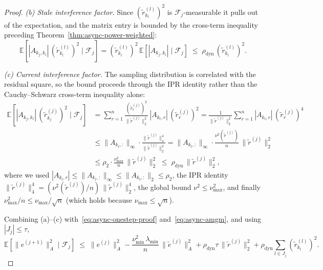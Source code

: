 \documentclass[pdflatex,sn-mathphys-num]{sn-jnl}%
\newcommand{\E}{\mathbb{E}}
\newcommand{\Anorm}[1]{\|#1\|_{A}}
\newcommand{\lmin}{\lambda_{\min}}
\theoremstyle{thmstyleone}%
\theoremstyle{thmstyletwo}%
\theoremstyle{thmstylethree}%
\begin{document}
\begin{proof}
\textit{(b) Stale interference factor.} Since $(\tilde r_{k_l}^{(l)})^2$ is $\mathcal{F}_j$-measurable it pulls out of the expectation, and the matrix entry is bounded by the cross-term inequality preceding Theorem~\ref{thm:async-power-weighted}:
\[
\E\!\left[|A_{k_j, k_l}|\,(\tilde r_{k_l}^{(l)})^2 \mid \mathcal{F}_j\right] = (\tilde r_{k_l}^{(l)})^2\,\E\!\left[|A_{k_j, k_l}| \mid \mathcal{F}_j\right] \;\leq\; \rho_{\text{dyn}}\,(\tilde r_{k_l}^{(l)})^2.
\]

\textit{(c) Current interference factor.} The sampling distribution is correlated with the residual square, so the bound proceeds through the IPR identity rather than the Cauchy--Schwarz cross-term inequality alone:
\begin{align*}
\E\!\left[|A_{k_j, k_l}|\,(\tilde r_{k_j}^{(j)})^2 \mid \mathcal{F}_j\right]
&= \sum_{r=1}^n \frac{(\tilde r_r^{(j)})^2}{\|\tilde r^{(j)}\|_2^2}\,|A_{k_l, r}|\,(\tilde r_r^{(j)})^2
= \frac{1}{\|\tilde r^{(j)}\|_2^2}\sum_{r=1}^n |A_{k_l, r}|\,(\tilde r_r^{(j)})^4 \\
&\leq \|A_{k_l, :}\|_\infty \cdot \frac{\|\tilde r^{(j)}\|_4^4}{\|\tilde r^{(j)}\|_2^2}
= \|A_{k_l, :}\|_\infty \cdot \frac{\nu^2(\tilde r^{(j)})}{n}\,\|\tilde r^{(j)}\|_2^2 \\
&\leq \rho_2 \cdot \frac{\nu_{\max}^2}{n}\,\|\tilde r^{(j)}\|_2^2 \;\leq\; \rho_{\text{dyn}}\,\|\tilde r^{(j)}\|_2^2,
\end{align*}
where we used $|A_{k_l, r}| \leq \|A_{k_l, :}\|_\infty \leq \|A_{k_l, :}\|_2 \leq \rho_2$, the IPR identity $\|\tilde r^{(j)}\|_4^4 = (\nu^2(\tilde r^{(j)})/n)\,\|\tilde r^{(j)}\|_2^4$, the global bound $\nu^2 \leq \nu_{\max}^2$, and finally $\nu_{\max}^2/n \leq \nu_{\max}/\sqrt n$ (which holds because $\nu_{\max} \leq \sqrt n$).

Combining (a)--(c) with~\eqref{eq:async-onestep-proof} and~\eqref{eq:async-amgm}, and using $|J_j| \leq \tau$,
\begin{equation}
\label{eq:async-condexp}
\E[\Anorm{e^{(j+1)}}^2 \mid \mathcal{F}_j] \;\leq\; \Anorm{e^{(j)}}^2 - \frac{\nu_{\min}^2\,\lmin}{n}\,\Anorm{\tilde e^{(j)}}^2 + \rho_{\text{dyn}}\tau\,\|\tilde r^{(j)}\|_2^2 + \rho_{\text{dyn}}\sum_{l \in J_j}(\tilde r_{k_l}^{(l)})^2.
\end{equation}


\end{proof}
\end{document}
